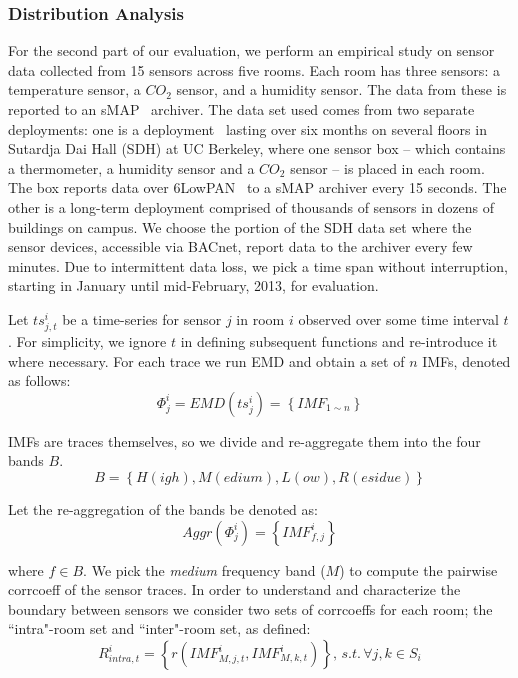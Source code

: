 \subsubsection{Distribution Analysis}
For the second part of our evaluation, we perform an empirical study on sensor data collected from 15 sensors across five rooms. 
Each room has three sensors: a temperature sensor, a $CO_{2}$ sensor,  and a humidity sensor. 
The data from these is reported to an  
sMAP~\cite{smap} archiver. The data set used comes from two separate deployments: one is a deployment~\cite{Jay} lasting 
over six months on several floors in Sutardja Dai Hall (SDH) at UC Berkeley, where one sensor box -- which contains a thermometer, a humidity sensor
 and a $CO_{2}$ sensor -- is placed in each room. The box reports data over 6LowPAN~\cite{6lowpan} to a sMAP archiver every 
 15 seconds. The other is a long-term deployment comprised of thousands of sensors in dozens of buildings on campus. 
 We choose the portion of the SDH data set where the sensor devices, accessible via BACnet, report data to the archiver every few minutes. 
 Due to intermittent data loss, we pick a time span without interruption, starting in January until mid-February, 2013, for evaluation.

Let $ts^{i}_{j,t}$ be a time-series for sensor $j$ in room $i$ observed over some time interval $t$.  For simplicity, we ignore
$t$ in defining subsequent functions and re-introduce it where necessary.
For each trace we run EMD and obtain a set of $n$ IMFs, denoted as follows:
\begin{displaymath}
\Phi^i_j = EMD(ts^i_j) = \left \{ IMF_{1\sim n} \right \}
\end{displaymath}

IMFs are traces themselves, so we divide and re-aggregate them into the four bands $B$.
\begin{displaymath}
B = \left \{ H(igh), M(edium), L(ow), R(esidue) \right \}
\end{displaymath} 

Let the re-aggregation of the bands be denoted as:
\begin{displaymath}
Aggr(\Phi^i_j) = \left \{ IMF^i_{f,j} \right \}
\end{displaymath} 

where $f \in B$.  We pick the \emph{medium} frequency band ($M$) to compute the pairwise corrcoeff of the sensor traces. 
In order to understand and characterize the boundary between sensors we consider two sets of corrcoeffs for each room; the ``intra"-room set and 
``inter"-room set, as defined:
\begin{displaymath}
R^{i}_{intra,t} = \left \{ r(IMF^{i}_{M,j,t}, IMF^{i}_{M,k,t}) \right \}, \,
s.t.\, \forall j,k \in S_i
\end{displaymath}

